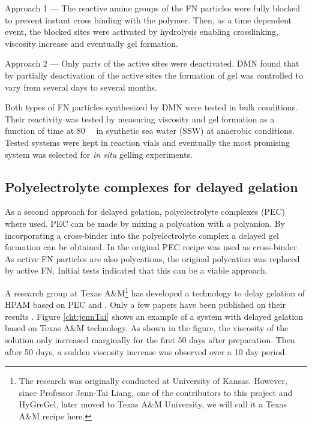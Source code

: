 \documentclass[nanomaterials,article,submit,moreauthors,pdftex]{Definitions/mdpi}
\begin{document}
    Approach 1 --- The reactive amine groups of the FN particles were fully blocked to prevent instant cross binding with the polymer. Then, as a time dependent event, the blocked sites were activated by hydrolysis enabling crosslinking, viscosity increase and eventually gel formation.
    
    Approach 2 --- Only parts of the active sites were deactivated. DMN found that by partially deactivation of the active sites the formation of gel was controlled to vary from several days to several months.
    
Both types of FN particles synthesized by DMN were tested in bulk conditions. Their reactivity was tested by measuring viscosity and gel formation as a function of time at 80~\celsius~ in synthetic sea water (SSW) at anaerobic conditions. Tested systems were kept in reaction vials and eventually the most promising system  was selected for \textit{in situ} gelling experiments.
    
\subsection{Polyelectrolyte complexes for delayed gelation}
As a second approach for delayed gelation, polyelectrolyte complexes (PEC) where used. PEC can be made by mixing a polycation with a polyanion. By incorporating a cross-binder into the polyelectrolyte complex a delayed gel formation can be obtained. In the original PEC recipe  was used as cross-binder. As active FN particles are also polycations, the original polycation was replaced by active FN. Initial tests indicated that this can be a viable approach.

A research group at Texas A\&M\footnote{The research was originally conducted at University of Kansas. However, since Professor Jenn-Tai Liang, one of the contributors to this project and HyGreGel, later moved to Texas A\&M University, we will call it a Texas A\&M recipe here.} has developed a technology to delay gelation of HPAM based on PEC and . Only a few papers have been published on their results \citep{Cordova2008,Johnson2010}. Figure \ref{cht:jennTai} shows an example of a system with delayed gelation based on Texas A\&M technology. As shown in the figure, the viscosity of the solution only increased marginally for the first 50 days after preparation. Then after 50 days, a sudden viscosity increase was observed over a 10 day period.
\end{document}
